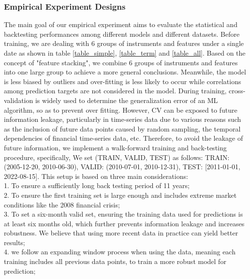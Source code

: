 \documentclass[10pt,letterpaper]{article}
\begin{document}
 \subsubsection*{Empirical Experiment Designs}
 The main goal of our empirical experiment aims to evaluate the statistical and backtesting performances among different models and different datasets. Before training, we are dealing with 6 groups of instruments and features under a single date as shown in table \ref{table_simple}, \ref{table_term} and \ref{table_all}. Based on the concept of "feature stacking", we combine 6 groups of instruments and features into one large group to achieve a more general conclusions. Meanwhile, the model is less biased by outliers and over-fitting is less likely to occur while correlations among prediction targets are not considered in the model. During training, cross-validation is widely used to determine the generalization error of an ML algorithm, so as to prevent over fitting. However, CV can be exposed to future information leakage, particularly in time-series data due to various reasons such as the inclusion of future data points caused by random sampling, the temporal dependencies of financial time-series data, etc. Therefore, to avoid the leakage of future information, we implement a walk-forward training and back-testing procedure, specifically, We set (TRAIN, VALID, TEST) as follows: TRAIN: (2005-12-20, 2010-06-30), VALID: (2010-07-01, 2010-12-31), TEST: [2011-01-01, 2022-08-15]. This setup is based on three main considerations:
 \\1. To ensure a sufficiently long back testing period of 11 years; \\2. To ensure the first training set is large enough and includes extreme market conditions like the 2008 financial crisis;
 \\3. To set a six-month valid set, ensuring the training data used for predictions is at least six months old, which further prevents information leakage and increases robustness. We believe that using more recent data in practice can yield better results;
 \\4. we follow an expanding window process  when using the data, meaning each training includes all previous data points, to train a more robust model for prediction;
\end{document}
